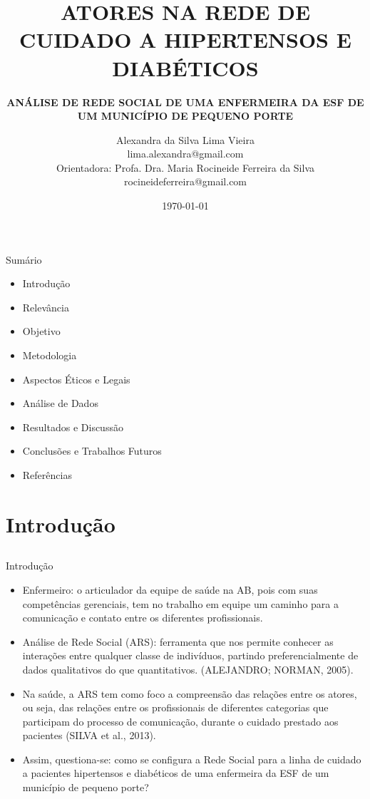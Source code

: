 \documentclass[10pt]{beamer}
\title[] %
{ %
      \textbf{ATORES NA REDE DE CUIDADO A HIPERTENSOS E DIABÉTICOS}
}
\subtitle[The Feather Beamer Theme]
{
      \textbf{ANÁLISE DE REDE SOCIAL DE UMA ENFERMEIRA DA ESF DE UM MUNICÍPIO DE PEQUENO PORTE}
}
\author[Alexandra da Silva Lima Vieira]
{      Alexandra da Silva Lima Vieira \\
      {\ttfamily lima.alexandra@gmail.com}\\
      Orientadora: Profa. Dra. Maria Rocineide Ferreira da Silva \\
      {\ttfamily rocineideferreira@gmail.com}
}
\institute[]
{
	Centro de Ciências da Saúde - Enfermagem\\
      Universidade Estadual do Ceará\\
  
}
\date{\today}
\begin{document}

{\1%
\begin{frame}[plain,noframenumbering] %
  \titlepage %
\end{frame}}


\begin{frame}{Sumário}{}
  \begin{itemize}
    \item Introdução
    \item Relevância
    \item Objetivo
    \item Metodologia
    \item Aspectos Éticos e Legais
    \item Análise de Dados
    \item Resultados e Discussão
    \item Conclusões e Trabalhos Futuros
    \item Referências
  \end{itemize}

\end{frame}

\section{Introdução}
\subsection{}
\begin{frame}{Introdução}{}

  \begin{itemize}
    \item Enfermeiro:  o articulador da equipe de saúde na AB, pois com
 suas competências gerenciais, tem no trabalho em equipe um caminho para a comunicação e
 contato entre os diferentes profissionais.
    \item Análise de Rede  Social (ARS): ferramenta que nos permite conhecer as interações entre qualquer  classe de indivíduos, partindo preferencialmente de dados qualitativos do que quantitativos.  (ALEJANDRO; NORMAN, 2005).
 	\item Na saúde, a ARS tem como foco a compreensão das relações entre
 os atores, ou seja, das relações entre os profissionais de diferentes categorias que participam do processo de comunicação, durante o cuidado prestado aos pacientes (SILVA et al., 2013).
 	\item Assim, questiona-se: como se configura a Rede Social para a linha de cuidado
 a pacientes hipertensos e diabéticos de uma enfermeira da ESF de um município de pequeno
 porte?
  \end{itemize}
\end{frame}
\end{document}
